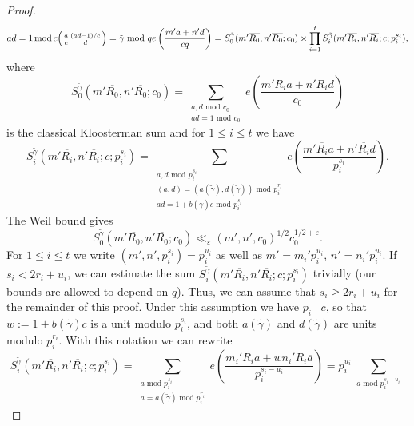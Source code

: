 \documentclass{article}
\theoremstyle{named}
\DeclareMathOperator{\modulo}{mod}
\begin{document}
\begin{proof}
\begin{equation*}
{{    ad = 1 \modulo c\\
    \begin{psmallmatrix}
        a & (ad-1)/c\\
        c & d
    \end{psmallmatrix} = \tilde{\gamma} \text{ mod }q}} e\left(\frac{m'a + n'd}{cq}\right) = S^{\tilde{\gamma}}_0(m'\overline{R_0}, n' \overline{R_0}; c_0) \times \prod_{i = 1}^t S^{\tilde{\gamma}}_i(m'\overline{R_i}, n' \overline{R_i}; c; p_i^{s_i}),
\end{equation*}
where 
\begin{equation*}
S^{\tilde{\gamma}}_0(m'\overline{R_0}, n' \overline{R_0}; c_0) = \sum_{\substack{a, d \text{ mod }c_0\\
ad = 1 \text{ mod }c_0}} e\left(\frac{m'\overline{R_i}a + n'\overline{R_i}d}{c_0}\right)
\end{equation*} 
is the classical Kloosterman sum and for $1\leq i \leq t$ we have
\begin{equation*}
S^{\tilde{\gamma}}_i(m'\overline{R_i}, n' \overline{R_i}; c; p_i^{s_i}) = \sum_{\substack{a, d \text{ mod }p_i^{s_i}\\
(a, d) = (a(\tilde{\gamma}), d(\tilde{\gamma})) \text{ mod }p_i^{r_i}\\
ad = 1 + b(\tilde{\gamma})c \text{ mod }p_i^{s_i}}} e\left(\frac{m' \overline{R_i}a + n' \overline{R_i}d}{p_i^{s_i}}\right).
\end{equation*}
The Weil bound gives
\begin{equation*}
S^{\tilde{\gamma}}_0(m'\overline{R_0}, n' \overline{R_0}; c_0)     \ll_\varepsilon (m', n', c_0)^{1/2}c_0^{1/2 + \varepsilon}.
\end{equation*}
For $1 \leq i \leq t$ we write $(m', n', p_i^{s_i}) = p_i^{u_i}$ as well as $m' = m_i' p_i^{u_i}$, $n' = n_i' p_i^{u_i}$. If $s_i < 2r_i + u_i$, we can estimate the sum $S^{\tilde{\gamma}}_i(m'\overline{R_i}, n' \overline{R_i}; c; p_i^{s_i})$ trivially (our bounds are allowed to depend on $q$). Thus, we can assume that $s_i \geq 2r_i + u_i$ for the remainder of this proof. Under this assumption we have $p_i \mid c$, so that $w := 1 + b(\widetilde{\gamma})c$ is a unit modulo $p_i^{s_i}$, and both $a(\widetilde{\gamma})$ and $d(\widetilde{\gamma})$ are units modulo $p_i^{r_i}$. With this notation we can rewrite 
\begin{equation*}
    S^{\tilde{\gamma}}_i(m'\overline{R_i}, n' \overline{R_i}; c; p_i^{s_i}) = \sum_{\substack{a \modulo p_i^{s_i}\\
    a = a(\widetilde{\gamma}) \modulo p_i^{r_i}}} e\left(\frac{m_i' \overline{R_i} a + wn_i' \overline{R_i} \overline{a}}{p_i^{s_i - u_i}}\right) = p_i^{u_i} \sum_{\substack{a \modulo p_i^{s_i - u_i}\\
}}
\end{equation*}
\end{proof}
\end{document}
